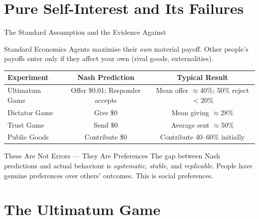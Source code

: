 \documentclass[aspectratio=169]{beamer}
\begin{document}
\section{Pure Self-Interest and Its Failures}

\begin{frame}{The Standard Assumption and the Evidence Against}
\begin{block}{Standard Economics}
Agents maximise their \textit{own} material payoff. Other people's payoffs enter only if they affect your own (rival goods, externalities).
\end{block}
\begin{center}
\begin{tabular}{lcc}
\toprule
\textbf{Experiment} & \textbf{Nash Prediction} & \textbf{Typical Result}\\
\midrule
Ultimatum Game & Offer \$0.01; Responder accepts & Mean offer $\approx$40\%; 50\% reject $<$20\%\\
Dictator Game & Give \$0 & Mean giving $\approx$28\%\\
Trust Game & Send \$0 & Average sent $\approx$50\%\\
Public Goods & Contribute \$0 & Contribute 40--60\% initially\\
\bottomrule
\end{tabular}
\end{center}
\begin{alertblock}{These Are Not Errors --- They Are Preferences}
The gap between Nash predictions and actual behaviour is \textit{systematic}, \textit{stable}, and \textit{replicable}. People have genuine preferences over others' outcomes. This is \alert{social preferences}.
\end{alertblock}
\end{frame}

\section{The Ultimatum Game}
\end{document}

